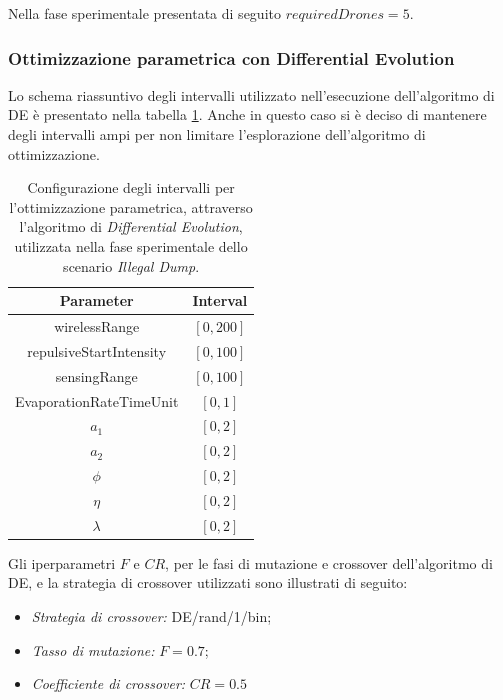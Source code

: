 Nella fase sperimentale presentata di seguito $requiredDrones = 5$.

\subsubsection{Ottimizzazione parametrica con Differential Evolution}

Lo schema riassuntivo degli intervalli utilizzato nell'esecuzione dell'algoritmo di DE è presentato nella tabella \ref{tabella_intervalli_dump_ABC}.
Anche in questo caso si è deciso di mantenere degli intervalli ampi per non limitare l'esplorazione dell'algoritmo di ottimizzazione.

\begin{table}[H]
    \centering
    \captionsetup{justification=centering, margin=2cm, font=footnotesize}
    \begin{tabular}{|c|c|}
    \hline
    \textbf{Parameter}              & \textbf{Interval}                 \\ \hline
    wirelessRange                   & $[0,200]$                 \\ \hline
    repulsiveStartIntensity         & $[0,100]$                 \\ \hline
    sensingRange                    & $[0,100]$                 \\ \hline
    EvaporationRateTimeUnit         & $[0,1]$                   \\ \hline
    $a_{1}$                         & $[0,2]$                   \\ \hline
    $a_{2}$                         & $[0,2]$                   \\ \hline
    $\phi$                          & $[0,2]$                   \\ \hline
    $\eta$                          & $[0,2]$                   \\ \hline
    $\lambda$                       & $[0,2]$                   \\ \hline
    \end{tabular}%
    
    \caption{Configurazione degli intervalli per l'ottimizzazione parametrica, attraverso l'algoritmo di \textit{Differential Evolution}, utilizzata nella fase sperimentale dello scenario \textit{Illegal Dump}.}
    \label{tabella_intervalli_dump_ABC}
\end{table}

Gli iperparametri $F$ e $CR$, per le fasi di mutazione e crossover dell'algoritmo di DE, e la strategia di crossover utilizzati sono illustrati di seguito:
\begin{itemize}
    \item \textit{Strategia di crossover:} DE/rand/1/bin;
    \item \textit{Tasso di mutazione:} $F=0.7$;
    \item \textit{Coefficiente di crossover:} $CR=0.5$
\end{itemize}

